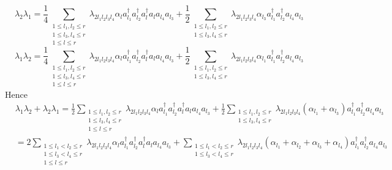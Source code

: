 \documentclass[aps,preprint]{revtex4}%
\begin{document}
\begin{equation}
\lambda_{2}\lambda_{1}=\frac{1}{4}\sum_{\substack{1\leq l_{1},l_{2}\leq
r\\1\leq l_{3},l_{4}\leq r\\1\leq l\leq r}}\lambda_{2l_{1}l_{2}l_{3}l_{4}%
}\alpha_{l}a_{l_{1}}^{\dagger}a_{l_{2}}^{\dagger}a_{l}^{\dagger}a_{l}a_{l_{4}%
}a_{l_{3}}+\frac{1}{2}\sum_{\substack{1\leq l_{1},l_{2}\leq r\\1\leq
l_{3},l_{4}\leq r}}\lambda_{2l_{1}l_{2}l_{3}l_{4}}\alpha_{l_{3}}a_{l_{1}%
}^{\dagger}a_{l_{2}}^{\dagger}a_{l_{4}}a_{l_{3}}%
\end{equation}%
\begin{equation}
\lambda_{1}\lambda_{2}=\frac{1}{4}\sum_{\substack{1\leq l_{1},l_{2}\leq
r\\1\leq l_{3},l_{4}\leq r\\1\leq l\leq r}}\lambda_{2l_{1}l_{2}l_{3}l_{4}%
}\alpha_{l}a_{l_{1}}^{\dagger}a_{l_{2}}^{\dagger}a_{l}^{\dagger}a_{l}a_{l_{4}%
}a_{l_{3}}+\frac{1}{2}\sum_{\substack{1\leq l_{1},l_{2}\leq r\\1\leq
l_{3},l_{4}\leq r}}\lambda_{2l_{1}l_{2}l_{3}l_{4}}\alpha_{l_{1}}a_{l_{1}%
}^{\dagger}a_{l_{2}}^{\dagger}a_{l_{4}}a_{l_{3}}%
\end{equation}
Hence%
\begin{align}
&  \lambda_{1}\lambda_{2}+\lambda_{2}\lambda_{1}=\frac{1}{2}\sum
_{\substack{1\leq l_{1},l_{2}\leq r\\1\leq l_{3},l_{4}\leq r\\1\leq l\leq
r}}\lambda_{2l_{1}l_{2}l_{3}l_{4}}\alpha_{l}a_{l_{1}}^{\dagger}a_{l_{2}%
}^{\dagger}a_{l}^{\dagger}a_{l}a_{l_{4}}a_{l_{3}}+\frac{1}{2}\sum
_{\substack{1\leq l_{1},l_{2}\leq r\\1\leq l_{3},l_{4}\leq r}}\lambda
_{2l_{1}l_{2}l_{3}l_{4}}\left(  \alpha_{l_{1}}+\alpha_{l_{3}}\right)
a_{l_{1}}^{\dagger}a_{l_{2}}^{\dagger}a_{l_{4}}a_{l_{3}}\\
&  =2\sum_{\substack{1\leq l_{1}<l_{2}\leq r\\1\leq l_{3}<l_{4}\leq r\\1\leq
l\leq r}}\lambda_{2l_{1}l_{2}l_{3}l_{4}}\alpha_{l}a_{l_{1}}^{\dagger}a_{l_{2}%
}^{\dagger}a_{l}^{\dagger}a_{l}a_{l_{4}}a_{l_{3}}+\sum_{\substack{1\leq
l_{1}<l_{2}\leq r\\1\leq l_{3}<l_{4}\leq r}}\lambda_{2l_{1}l_{2}l_{3}l_{4}%
}\left(  \alpha_{l_{1}}+\alpha_{l_{2}}+\alpha_{l_{3}}+\alpha_{l_{4}}\right)
a_{l_{1}}^{\dagger}a_{l_{2}}^{\dagger}a_{l_{4}}a_{l_{3}}%
\end{align}
\end{document}
